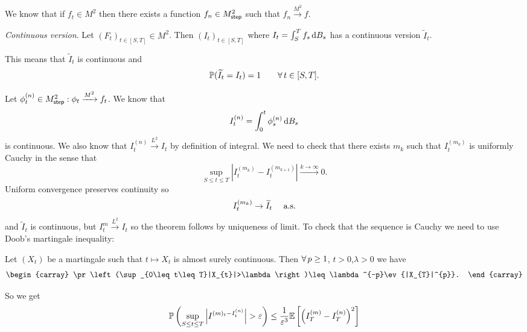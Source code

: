 \documentclass[12pt]{report}
\begin{document}
We know that if $f_{t}\in M^{2}$ then there exists a function $f_{n}\in M^{2}_{\mathsf{step}}$ such that $f_{n}\xrightarrow{M^{2}}f$.
\begin{theorem}
	\emph{Continuous version}. Let ${(F_{t})}_{t\in[S,T]}\in M^{2}$. Then ${(I_{t})}_{t\in[S,T]}$ where $I_{t}=\int_{S}^{T}f_{s}\mathop{}\!\mathrm{d} B_{s}$ has a continuous version $\widetilde{I}_{t}$.
\end{theorem}
This means that $\widetilde{I}_{t}$ is continuous and 
\begin{equation*}
	\mathbb{P}(\widetilde{I}_{t}=I_{t})=1\qquad\forall\, t\in[S,T].
\end{equation*}
\begin{fancyproof}
	Let $\phi^{(n)}_{t}\in M^{2}_{\mathsf{step}}:\phi_{t}\xrightarrow{M^{2}}f_{t}$. We know that \\
	\begin{equation*}
		I^{(n)}_{t}=\int_{0}^{t}\phi^{(n)}_{s}\mathop{}\!\mathrm{d} B_{s}
	\end{equation*}
	is continuous. We also know that $I^{(n)}_{t}\xrightarrow{L^{2}}I_{t}$ by definition of \ito{} integral. We need to check that there exists $m_{k}$ such that $I^{(m_{k})}_{t}$ is uniformly Cauchy in the sense that 
	\begin{equation*}
		\sup_{S\leq t\leq T}\left|I^{(m_{k})}_{t}-I^{(m_{k+1})}_{t}\right|\xrightarrow{k\to\infty}0.
	\end{equation*}
	Uniform convergence preserves continuity so
	\begin{equation*}
		I^{(m_{k})}_{t}\to\widetilde{I}_{t}\quad\text{ a.s.}{}
	\end{equation*}
	and $\widetilde{I}_{t}$ is continuous, but $I^{m}_{t}\xrightarrow{L^{2}}I_{t}$ so the theorem follows by uniqueness of limit.
	To check that the sequence is Cauchy we need to use Doob's martingale inequality:
	\begin{proposition}
		Let $(X_{t})$ be a martingale such that $t\mapsto X_{t}$ is almost surely continuous. Then $\forall\, p\geq 1$, $t>0$,$\lambda>0$ we have
		\begin{equation*}
			\begin{carray}
				\pr\left(\sup_{0\leq t\leq T}|X_{t}|>\lambda\right)\leq\lambda^{-p}\ev{|X_{T}|^{p}}.
			\end{carray}
		\end{equation*}
	\end{proposition}
	So we get 
	\begin{align*}
		\pr\left(\sup_{S\leq t\leq T}\left|I^{(m)_{t}-I^{(n)}_{t}}\right|>\varepsilon\right)&\leq\frac{1}{\varepsilon^{3}}\ev{\left(I^{(m)}_{T}-I^{(n)}_{T}\right)^{2}}\\

\end{align*}
\end{fancyproof}
\end{document}
